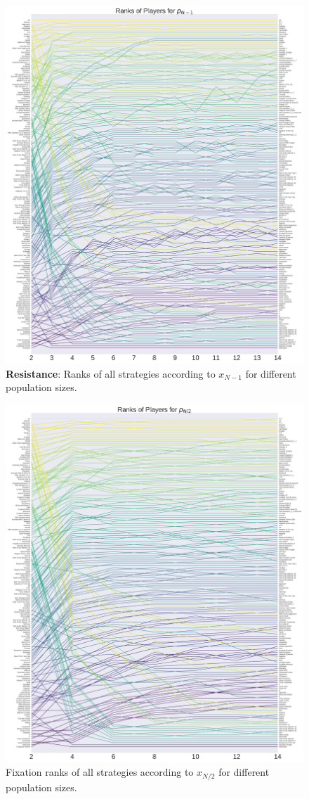 \documentclass[10pt,letterpaper]{article}
\begin{document}
\begin{figure}[!hbtp]
    \centering
    \includegraphics[width=\columnwidth]{./average_rank_vs_population_size_resist.pdf}
    \caption{\textbf{Resistance}: Ranks of all strategies according to \(x_{N-1}\) for different
    population sizes.}
    \label{fig:ranks_v_size_resist}
\end{figure}

\begin{figure}[!hbtp]
    \centering
    \includegraphics[width=\columnwidth]{./average_rank_vs_population_size_coexist.pdf}
    \caption{Fixation ranks of all strategies according to \(x_{N/2}\) for different
    population sizes.}
    \label{fig:ranks_v_size_coexist}
\end{figure}
\end{document}
